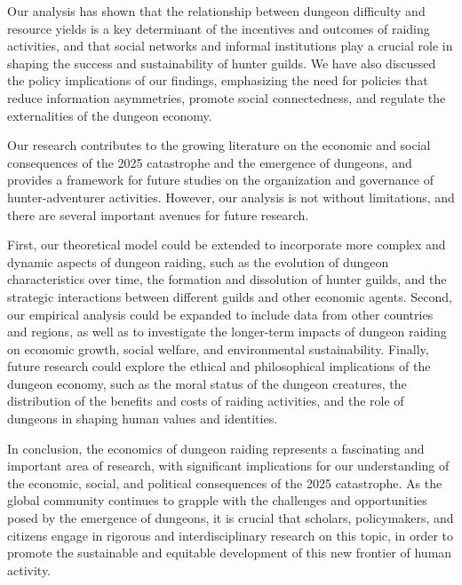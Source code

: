 \documentclass[12pt, a4paper]{article}
\begin{document}
Our analysis has shown that the relationship between dungeon difficulty and resource yields is a key determinant of the incentives and outcomes of raiding activities, and that social networks and informal institutions play a crucial role in shaping the success and sustainability of hunter guilds. We have also discussed the policy implications of our findings, emphasizing the need for policies that reduce information asymmetries, promote social connectedness, and regulate the externalities of the dungeon economy.

Our research contributes to the growing literature on the economic and social consequences of the 2025 catastrophe and the emergence of dungeons, and provides a framework for future studies on the organization and governance of hunter-adventurer activities. However, our analysis is not without limitations, and there are several important avenues for future research.

First, our theoretical model could be extended to incorporate more complex and dynamic aspects of dungeon raiding, such as the evolution of dungeon characteristics over time, the formation and dissolution of hunter guilds, and the strategic interactions between different guilds and other economic agents. Second, our empirical analysis could be expanded to include data from other countries and regions, as well as to investigate the longer-term impacts of dungeon raiding on economic growth, social welfare, and environmental sustainability. Finally, future research could explore the ethical and philosophical implications of the dungeon economy, such as the moral status of the dungeon creatures, the distribution of the benefits and costs of raiding activities, and the role of dungeons in shaping human values and identities.

In conclusion, the economics of dungeon raiding represents a fascinating and important area of research, with significant implications for our understanding of the economic, social, and political consequences of the 2025 catastrophe. As the global community continues to grapple with the challenges and opportunities posed by the emergence of dungeons, it is crucial that scholars, policymakers, and citizens engage in rigorous and interdisciplinary research on this topic, in order to promote the sustainable and equitable development of this new frontier of human activity.



\end{document}
